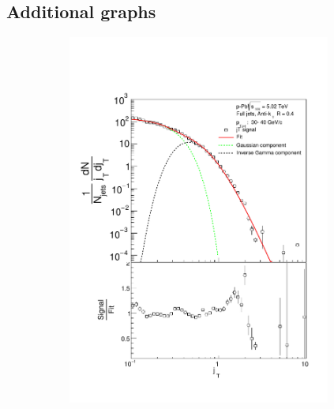 \begin{appendices}

\section{Additional graphs}
\label{app:a}

\begin{figure}
\centering
\begin{subfigure}{0.24\textwidth}
\includegraphics[width=0.95\textwidth]{results/JetConejTSignalFit/JetConejTSignalFitNFin00JetPt03perconeBgBayes}

\end{subfigure}
\end{figure}
\end{appendices}
